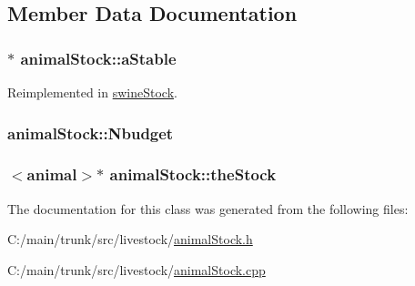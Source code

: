 \subsection{Member Data Documentation}
\hypertarget{classanimal_stock_a3f463dfdca4991f4555581e8d2a7e6c0}{
\subsubsection[{aStable}]{$\ast$ {\bf animalStock::aStable}}}
\label{classanimal_stock_a3f463dfdca4991f4555581e8d2a7e6c0}


Reimplemented in \hyperlink{classswine_stock_a78239ce5b75f52957d37b09e3bb8fbb9}{swineStock}.\hypertarget{classanimal_stock_ae28046254cae05a55efe5dbe41baeeab}{
\subsubsection[{Nbudget}]{ {\bf animalStock::Nbudget}}}
\label{classanimal_stock_ae28046254cae05a55efe5dbe41baeeab}
\hypertarget{classanimal_stock_ad953b662fecba40e83dd04350ed2189f}{
\subsubsection[{theStock}]{$<${\bf animal}$>$$\ast$ {\bf animalStock::theStock}}}
\label{classanimal_stock_ad953b662fecba40e83dd04350ed2189f}


The documentation for this class was generated from the following files:\begin{DoxyCompactItemize}
\item 
C:/main/trunk/src/livestock/\hyperlink{animal_stock_8h}{animalStock.h}\item 
C:/main/trunk/src/livestock/\hyperlink{animal_stock_8cpp}{animalStock.cpp}\end{DoxyCompactItemize}
